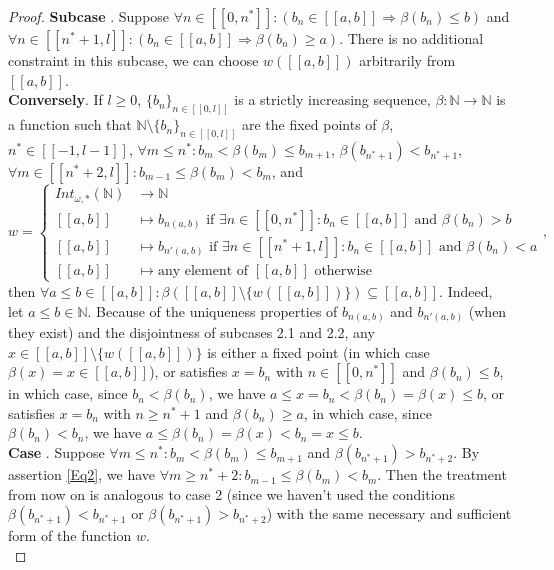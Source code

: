 \documentclass[10pt,a4paper]{amsart}
\newcommand*\circled[1]{\tikz[baseline=(char.base)]{
            \node[shape=circle,draw,inner sep=2pt] (char) {#1};}}
\begin{document}
\begin{proof}
\textbf{Subcase \circled{2.3}}. Suppose $\forall n \in [\![0,n^*]\!] : (b_n \in [\![a,b]\!] \Rightarrow \beta(b_n) \leq b)$ and ${\forall n \in [\![n^*+1,l]\!] : (b_n \in [\![a,b]\!] \Rightarrow \beta(b_n) \geq a)}$. There is no additional constraint in this subcase, we can choose $w([\![a,b]\!])$ arbitrarily from $[\![a,b]\!]$. \\
\textbf{Conversely}. If $l \geq 0$, $\{b_n\}_{n \in [\![0,l]\!]}$ is a strictly increasing sequence, $\beta : \mathbb{N} \to \mathbb{N}$ is a function such that $\mathbb{N} \setminus \{b_n\}_{n \in [\![0,l]\!]}$ are the fixed points of $\beta$, $n^* \in [\![-1,l-1]\!]$, $\forall m \leq n^* : b_m < \beta(b_m) \leq b_{m+1}$, $\beta(b_{n^*+1}) < b_{n^*+1}$, $\forall m \in [\![n^*+2,l]\!] : b_{m-1} \leq \beta(b_m) < b_m$, and 
\[ w = \begin{cases} Int_{\omega,*}(\mathbb{N}) &\to \mathbb{N} \\ [\![a,b]\!] &\mapsto b_{n(a,b)} \text { if } \exists n \in [\![0,n^*]\!] : b_n \in [\![a,b]\!] \text{ and } \beta(b_n) > b \\ [\![a,b]\!] &\mapsto b_{n'(a,b)} \text { if } \exists n \in [\![n^*+1,l]\!] : b_n \in [\![a,b]\!] \text{ and } \beta(b_n) < a \\ [\![a,b]\!] &\mapsto \text{any element of } [\![a,b]\!] \text{ otherwise} \end{cases}, \]
then $\forall a \leq b \in [\![a,b]\!] : \beta([\![a,b]\!] \setminus \{w([\![a,b]\!])\}) \subseteq [\![a,b]\!]$. Indeed, let $a \leq b \in \mathbb{N}$. Because of the uniqueness properties of $b_{n(a,b)}$ and $b_{n'(a,b)}$ (when they exist) and the disjointness of subcases 2.1 and 2.2, any $x \in [\![a,b]\!] \setminus \{w([\![a,b]\!])\}$ is either a fixed point (in which case $\beta(x) = x \in [\![a,b]\!]$), or satisfies $x = b_n$ with $n \in [\![0,n^*]\!]$ and $\beta(b_n) \leq b$, in which case, since $b_n < \beta(b_n)$, we have $a \leq x =  b_n < \beta(b_n) = \beta(x) \leq b$, or satisfies $x = b_n$ with $n \geq n^* + 1$ and $\beta(b_n) \geq a$, in which case, since $\beta(b_n) < b_n$, we have $a \leq \beta(b_n) = \beta(x) < b_n = x \leq b$.  \\
\textbf{Case \circled{3}}.  Suppose $\forall m \leq n^* : b_m < \beta(b_m) \leq b_{m+1}$ and $\beta(b_{n^*+1}) > b_{n^*+2}$. By assertion \ref{Eq2}, we have $\forall m \geq n^* + 2 : b_{m-1} \leq \beta(b_m) < b_m$. Then the treatment from now on is analogous to case 2 (since we haven't used the conditions $\beta(b_{n^*+1}) < b_{n^*+1}$ or $\beta(b_{n^*+1}) > b_{n^*+2}$) with the same necessary and sufficient form of the function $w$.\\
\end{proof}
\end{document}

